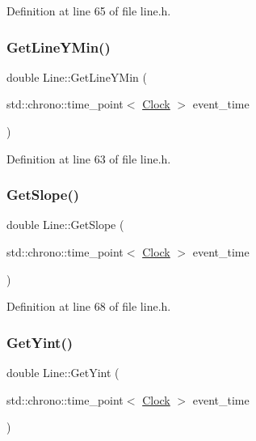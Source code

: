 Definition at line 65 of file line.\+h.

\mbox{\label{class_line_ae8151f5f3b102924b09de686f536e220}} 
\subsubsection{\texorpdfstring{Get\+Line\+Y\+Min()}{GetLineYMin()}}
{\footnotesize\ttfamily double Line\+::\+Get\+Line\+Y\+Min (\begin{DoxyParamCaption}\item[{std\+::chrono\+::time\+\_\+point$<$ \mbox{\hyperlink{universe_8h_a0ef8d951d1ca5ab3cfaf7ab4c7a6fd80}{Clock}} $>$}]{event\+\_\+time }\end{DoxyParamCaption})\hspace{0.3cm}{\ttfamily [inline]}}



Definition at line 63 of file line.\+h.

\mbox{\label{class_line_a2be3926d47a1a8849007a6c29a603dcf}} 
\subsubsection{\texorpdfstring{Get\+Slope()}{GetSlope()}}
{\footnotesize\ttfamily double Line\+::\+Get\+Slope (\begin{DoxyParamCaption}\item[{std\+::chrono\+::time\+\_\+point$<$ \mbox{\hyperlink{universe_8h_a0ef8d951d1ca5ab3cfaf7ab4c7a6fd80}{Clock}} $>$}]{event\+\_\+time }\end{DoxyParamCaption})\hspace{0.3cm}{\ttfamily [inline]}}



Definition at line 68 of file line.\+h.

\mbox{\label{class_line_a5319d68ecb254ff61e2a46d5928aec93}} 
\subsubsection{\texorpdfstring{Get\+Yint()}{GetYint()}}
{\footnotesize\ttfamily double Line\+::\+Get\+Yint (\begin{DoxyParamCaption}\item[{std\+::chrono\+::time\+\_\+point$<$ \mbox{\hyperlink{universe_8h_a0ef8d951d1ca5ab3cfaf7ab4c7a6fd80}{Clock}} $>$}]{event\+\_\+time }\end{DoxyParamCaption})\hspace{0.3cm}{\ttfamily [inline]}}



